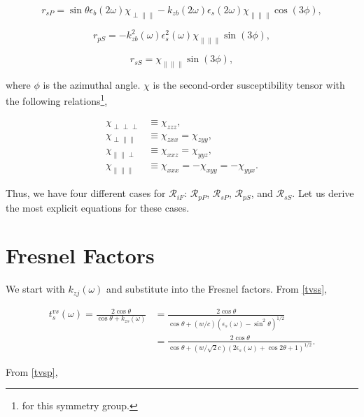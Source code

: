 \documentclass{article}
\begin{document}
\begin{equation}
r_{sP} = \sin\theta\epsilon_{b}(2\omega)\chi_{\perp\parallel\parallel} - k_{zb}(2\omega)\epsilon_{s}(2\omega)\chi_{\parallel\parallel\parallel}\cos(3\phi),
\end{equation}

\begin{equation}
r_{pS} = -k^{2}_{zb}(\omega)\epsilon^{2}_{s}(\omega)\chi_{\parallel\parallel\parallel}\sin(3\phi),
\end{equation}

\begin{equation}
r_{sS} = \chi_{\parallel\parallel\parallel}\sin(3\phi),
\end{equation}

where $\phi$ is the azimuthal angle. $\chi$ is the second-order susceptibility tensor with the following relations\footnote{for this symmetry group.},

\begin{align}
\chi_{\perp\perp\perp}&\equiv\chi_{zzz}, \nonumber \\
\chi_{\perp\parallel\parallel}&\equiv\chi_{zxx}=\chi_{zyy}, \nonumber \\
\chi_{\parallel\parallel\perp}&\equiv\chi_{xxz}=\chi_{yyz}, \nonumber \\
\chi_{\parallel\parallel\parallel}&\equiv\chi_{xxx}=-\chi_{xyy}=-\chi_{yyx}.
\end{align}

Thus, we have four different cases for $\mathcal{R}_{iF}$: $\mathcal{R}_{pP}$, $\mathcal{R}_{sP}$, $\mathcal{R}_{pS}$, and $\mathcal{R}_{sS}$. Let us derive the most explicit equations for these cases.

\section{Fresnel Factors}

We start with $k_{zj}(\omega)$ and substitute into the Fresnel factors. From \eqref{tvss},

\begin{align}
t^{vs}_{s}(\omega) = \frac{2\cos\theta}{\cos\theta + k_{zs}(\omega)} &= \frac{2\cos\theta}{\cos\theta + (w/c)(\epsilon_{s}(\omega) - \sin^{2}\theta)^{1/2}} \nonumber \\
&=\frac{2\cos\theta}{\cos\theta + (w/\sqrt{2}c)(2\epsilon_{s}(\omega) + \cos 2\theta + 1)^{1/2}}.
\end{align}

From \eqref{tvsp},
\end{document}
